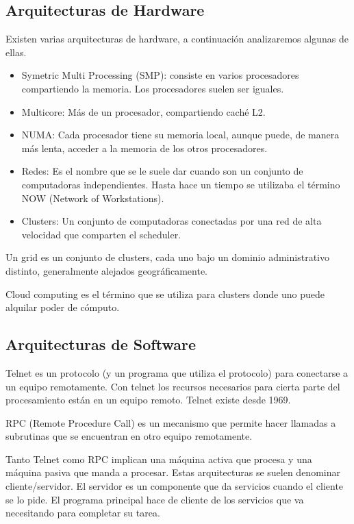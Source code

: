 \documentclass{article}
\begin{document}
\subsection{Arquitecturas de Hardware}

Existen varias arquitecturas de hardware, a continuaci\'on analizaremos algunas de ellas.

\begin{itemize}
\item Symetric Multi Processing (SMP): consiste en varios procesadores compartiendo la memoria. Los procesadores suelen ser iguales.
\item Multicore: M\'as de un procesador, compartiendo cach\'e L2.
\item NUMA: Cada procesador tiene su memoria local, aunque puede, de manera m\'as lenta, acceder a la memoria de los otros procesadores.
\item Redes: Es el nombre que se le suele dar cuando son un conjunto de computadoras independientes. Hasta hace un tiempo se utilizaba el t\'ermino NOW (Network of Workstations).
\item Clusters: Un conjunto de computadoras conectadas por una red de alta velocidad que comparten el scheduler.
\end{itemize}

Un grid es un conjunto de clusters, cada uno bajo un dominio administrativo distinto, generalmente alejados geogr\'aficamente.

Cloud computing es el t\'ermino que se utiliza para clusters donde uno puede alquilar poder de c\'omputo.

\subsection{Arquitecturas de Software}

Telnet es un protocolo (y un programa que utiliza el protocolo) para conectarse a un equipo remotamente. Con telnet los recursos necesarios para cierta parte del procesamiento est\'an en un equipo remoto. Telnet existe desde 1969.

RPC (Remote Procedure Call) es un mecanismo que permite hacer llamadas a subrutinas que se encuentran en otro equipo remotamente.

Tanto Telnet como RPC implican una m\'aquina activa que procesa y una m\'aquina pasiva que manda a procesar. Estas arquitecturas se suelen denominar cliente/servidor. El servidor es un componente que da servicios cuando el cliente se lo pide. El programa principal hace de cliente de los servicios que va necesitando para completar su tarea.
\end{document}
